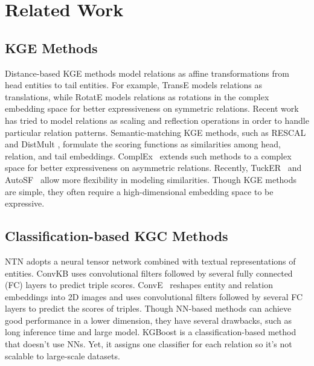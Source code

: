 \documentclass{article}
\begin{document}
\renewcommand{\figurename}{Figure}
\renewcommand{\tablename}{Table}

\section{Related Work}\label{sec:review}

\subsection{KGE Methods}

Distance-based KGE methods model relations as affine transformations from head entities to
tail entities. For example, TransE \citep{bordes2013translating} models relations as 
translations, while RotatE \citep{sun2018rotate} models relations as rotations in 
the complex embedding space for better expressiveness on symmetric relations. 
Recent work has tried to model relations as scaling \citep{chao2021pairre} and reflection 
\citep{zhang2022knowledge} operations in order to handle particular relation patterns. 
Semantic-matching KGE methods, such as RESCAL \citep{lin2015learning} and DistMult 
\citep{bordes2014semantic}, formulate the scoring functions as similarities 
among head, relation, and tail embeddings. ComplEx~\citep{trouillon2016complex} 
extends such methods to a complex space for better expressiveness on asymmetric relations. 
Recently, TuckER~\citep{balazevic2019tucker} and AutoSF~\citep{zhang2020autosf} allow 
more flexibility in modeling similarities. Though KGE methods are simple, 
they often require a high-dimensional embedding space to be expressive.


\subsection{Classification-based KGC Methods}

NTN \citep{socher2013reasoning} adopts a neural 
tensor network combined with textual representations of entities. 
ConvKB \citep{nguyen2018novel} uses 
convolutional filters followed by several fully connected
(FC) layers to predict triple scores.  ConvE~\citep{dettmers2018convolutional} reshapes entity and relation
embeddings into 2D images and uses  convolutional filters
followed by several FC layers to predict the scores of triples. 
Though NN-based methods can achieve good performance in a lower dimension,
they have several drawbacks, such as long inference time and large model. 
KGBoost \citep{wang2022kgboost} is a classification-based method that doesn't
use NNs. Yet, it assigns one classifier for each relation so it's not scalable
to large-scale datasets.
\end{document}
